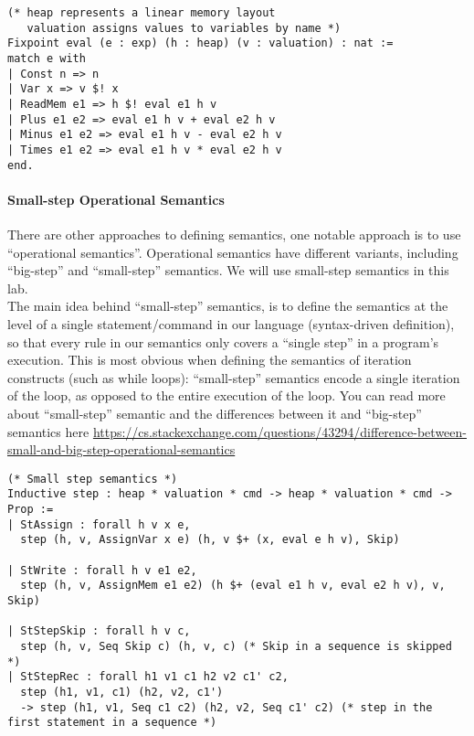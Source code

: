 \documentclass{article}
\begin{document}
\begin{enumerate}
    \begin{verbatim}
(* heap represents a linear memory layout
   valuation assigns values to variables by name *)
Fixpoint eval (e : exp) (h : heap) (v : valuation) : nat :=
match e with
| Const n => n
| Var x => v $! x
| ReadMem e1 => h $! eval e1 h v
| Plus e1 e2 => eval e1 h v + eval e2 h v
| Minus e1 e2 => eval e1 h v - eval e2 h v
| Times e1 e2 => eval e1 h v * eval e2 h v
end.
    \end{verbatim}
    
    \paragraph{Small-step Operational Semantics}
    There are other approaches to defining semantics, one notable approach is to use ``operational semantics''. Operational semantics have different variants, including ``big-step'' and ``small-step'' semantics. We will use small-step semantics in this lab. \\
    
    The main idea behind ``small-step'' semantics, is to define the semantics at the level of a single statement/command in our language (syntax-driven definition), so that every rule in our semantics only covers a ``single step'' in a program's execution. This is most obvious when defining the semantics of iteration constructs (such as while loops): ``small-step'' semantics encode a single iteration of the loop, as opposed to the entire execution of the loop. You can read more about ``small-step'' semantic and the differences between it and ``big-step'' semantics here \href{https://cs.stackexchange.com/questions/43294/difference-between-small-and-big-step-operational-semantics}{https://cs.stackexchange.com/questions/43294/difference-between-small-and-big-step-operational-semantics}

    \begin{verbatim}
(* Small step semantics *)
Inductive step : heap * valuation * cmd -> heap * valuation * cmd -> Prop :=
| StAssign : forall h v x e,
  step (h, v, AssignVar x e) (h, v $+ (x, eval e h v), Skip)

| StWrite : forall h v e1 e2,
  step (h, v, AssignMem e1 e2) (h $+ (eval e1 h v, eval e2 h v), v, Skip)

| StStepSkip : forall h v c,
  step (h, v, Seq Skip c) (h, v, c) (* Skip in a sequence is skipped *)
| StStepRec : forall h1 v1 c1 h2 v2 c1' c2,
  step (h1, v1, c1) (h2, v2, c1')
  -> step (h1, v1, Seq c1 c2) (h2, v2, Seq c1' c2) (* step in the first statement in a sequence *)


\end{verbatim}
\end{enumerate}
\end{document}
